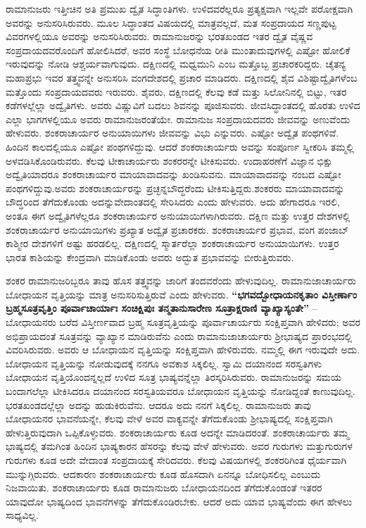 ರಾಮಾನುಜರು ಇತ್ತೀಚಿನ ಅತಿ ಪ್ರಮುಖ ದ್ವೈತ ಸಿದ್ಧಾಂತಿಗಳು. ಉಳಿದವರೆಲ್ಲರೂ ಪ್ರತ್ಯಕ್ಷವಾಗಿ ಇಲ್ಲವೇ ಪರೋಕ್ಷವಾಗಿ ಅವರನ್ನು ಅನುಸರಿಸಿರುವರು. ಮೂಲ ಸಿದ್ಧಾಂತದ ವಿಷಯದಲ್ಲಿ ಮಾತ್ರವಲ್ಲದೆ, ಮತ ಸಂಪ್ರದಾಯದ ಸಣ್ಣಪುಟ್ಟ ವಿವರಗಳಲ್ಲಿಯೂ ಅವರನ್ನು ಅನುಸರಿಸಿರುವರು. ರಾಮಾನುಜರನ್ನು ಭರತಖಂಡದ ಇತರ ದ್ವೈತ ವೈಷ್ಣವ ಸಂಪ್ರದಾಯದವರೊಂದಿಗೆ ಹೋಲಿಸಿದರೆ, ಅವರ ಸಂಸ್ಥೆ ಬೋಧನೆಯ ರೀತಿ ಮುಂತಾದುವುಗಳಲ್ಲಿ ಎಷ್ಟೋ ಹೋಲಿಕೆ ಇರುವುದನ್ನು ನೋಡಿ ಆಶ್ಚರ್ಯವಾಗುವುದು. ದಕ್ಷಿಣದಲ್ಲಿ ಮಧ್ವಮುನಿ ಎಂಬ ಮತ್ತೊಬ್ಬ ಪ್ರಚಾರಕರಿದ್ದರು. ಚೈತನ್ಯ ಮಹಾಪ್ರಭು ಇವರ ತತ್ತ್ವವನ್ನೇ ಅನುಸರಿಸಿ ವಂಗದೇಶದಲ್ಲಿ ಪ್ರಚಾರ ಮಾಡಿದರು. ದಕ್ಷಿಣದಲ್ಲಿ ಶೈವ ವಿಶಿಷ್ಟಾದ್ವೈತಿಗಳೆಂಬ ಮತ್ತೊಂದು ಸಂಪ್ರದಾಯದವರು ಇರುವರು. ಶೈವರು, ದಕ್ಷಿಣದಲ್ಲಿ ಕೆಲವು ಕಡೆ ಮತ್ತು ಸಿಲೋನಿನಲ್ಲಿ ಬಿಟ್ಟು, ಇತರ ಕಡೆಗಳಲ್ಲೆಲ್ಲಾ ಅದ್ವೈತಿಗಳು. ಅವರು ವಿಷ್ಣುವಿಗೆ ಬದಲು ಶಿವನನ್ನು ಪೂಜಿಸುವರು. ಜೀವಸಿದ್ಧಾಂತದಲ್ಲಿ ಹೊರತು ಉಳಿದ ಎಲ್ಲಾ ಭಾಗಗಳಲ್ಲಿಯೂ ಅವರು ರಾಮಾನುಜರಂತೆಯೇ. ರಾಮಾನುಜ ಸಂಪ್ರದಾಯದವರು ಜೀವವನ್ನು ಅಣುವೆಂದು ಹೇಳುವರು. ಶಂಕರಾಚಾರ್ಯರ ಅನುಯಾಯಿಗಳು ಜೀವವನ್ನು ವಿಭು ಎನ್ನುವರು. ಎಷ್ಟೋ ಅದ್ವೈತ ಪಂಥಗಳಿವೆ. ಹಿಂದಿನ ಕಾಲದಲ್ಲಿಯೂ ಎಷ್ಟೋ ಪಂಥಗಳಿದ್ದುವು. ಆದರೆ ಶಂಕರಾಚಾರ್ಯರು ಅವನ್ನು ಸಂಪೂರ್ಣ ಸ್ವೀಕರಿಸಿ ತಮ್ಮಲ್ಲಿ ಅಳವಡಿಸಿಕೊಂಡಿರುವರು. ಕೆಲವು ಟೀಕಾಚಾರ್ಯರು ಶಂಕರರನ್ನೇ ಟೀಕಿಸುವರು. ಉದಾಹರಣೆಗೆ ವಿಜ್ಞಾನ ಭಿಕ್ಷು ಅದ್ವೈತಿಯಾದರೂ ಶಂಕರಾಚಾರ್ಯರ ಮಾಯಾವಾದವನ್ನು ಖಂಡಿಸುವನು. ಮಾಯಾವಾದವನ್ನು ನಂಬದ ಎಷ್ಟೋ ಪಂಥಗಳಿದ್ದುವು.\break ಅವರು ಶಂಕರಾಚಾರ್ಯರನ್ನು ಪ್ರಚ್ಛನ್ನಬೌದ್ಧರೆಂದು ಟೀಕಿಸುತ್ತಿದ್ದರು.\break ಶಂಕರರು ಮಾಯಾವಾದವನ್ನು ಬೌದ್ಧರಿಂದ ತೆಗೆದುಕೊಂಡು ಅದನ್ನು\break ವೇದಾಂತದಲ್ಲಿ ಸೇರಿಸಿದರು ಎಂದು ಹೇಳುವರು. ಅದು ಹೇಗಾದರೂ ಇರಲಿ, ಅಂತೂ ಈಗ ಅದ್ವೈತಿಗಳೆಲ್ಲರೂ ಶಂಕರಾಚಾರ್ಯರ ಅನುಯಾಯಿಗಳಾಗಿರುವರು. ದಕ್ಷಿಣ ಮತ್ತು ಉತ್ತರ ದೇಶಗಳಲ್ಲಿ ಶಂಕರಾಚಾರ್ಯರ ಅನುಯಾಯಿಗಳು ಪ್ರಖ್ಯಾತ ಅದ್ವೈತ ಪ್ರಚಾರಕರು. ಶಂಕರಾಚಾರ್ಯರ ಪ್ರಭಾವ, ವಂಗ ಪಂಜಾಬ್​ ಕಾಶ್ಮೀರ ದೇಶಗಳಿಗೆ ಅಷ್ಟು ಹರಡಲಿಲ್ಲ. ದಕ್ಷಿಣದಲ್ಲಿ ಸ್ಮಾರ್ತರೆಲ್ಲಾ ಶಂಕರಾಚಾರ್ಯರ ಅನುಯಾಯಿಗಳು. ಉತ್ತರ ಭಾರತ ಕಾಶಿಯನ್ನು ಕೇಂದ್ರವಾಗಿ ಮಾಡಿಕೊಂಡು ಅವರು ಅದ್ಭುತ ಪ್ರಭಾವವನ್ನು ಬೀರುತ್ತಿರುವರು.

ಶಂಕರ ರಾಮಾನುಜರಿಬ್ಬರೂ ತಾವು ಹೊಸ ತತ್ತ್ವವನ್ನು ಜಾರಿಗೆ ತಂದವರೆಂದು ಹೇಳುವುದಿಲ್ಲ. ರಾಮಾನುಜಾಚಾರ್ಯರು ಬೋಧಾಯನ ವೃತ್ತಿಯನ್ನು ಮಾತ್ರ ಅನುಸರಿಸುತ್ತಿರುವೆ ಎಂದು ಹೇಳುವರು. \textbf{“ಭಗವದ್ಬೋಧಾಯನಕೃತಾಂ ವಿಸ್ತೀರ್ಣಾಂ ಬ್ರಹ್ಮಸೂತ್ರವೃತ್ತಿಂ ಪೂರ್ವಾಚಾರ್ಯಾಃ ಸಂಚಿಕ್ಷಿಪುಃ ತನ್ಮತಾನುಸಾರೇಣ ಸೂತ್ರಾಕ್ಷರಾಣಿ ವ್ಯಾಖ್ಯಾಸ್ಯಂತೇ”} – ಬೋಧಾಯನರು ಬರೆದ ವಿಸ್ತೀರ್ಣವಾದ ಬ್ರಹ್ಮ ಸೂತ್ರವೃತ್ತಿಯನ್ನು ಪೂರ್ವಾಚಾರ್ಯರು ಸಂಕ್ಷಿಪ್ತವಾಗಿ ಹೇಳಿದರು; ಅವರ ಅಭಿಪ್ರಾಯದಂತೆ ಸೂತ್ರವನ್ನು ವ್ಯಾಖ್ಯಾನ ಮಾಡಿರುವೆನು ಎಂದು ರಾಮಾನುಜಾಚಾರ್ಯರು ಶ‍್ರೀಭಾಷ್ಯದ ಪ್ರಾರಂಭದಲ್ಲಿ ವಿವರಿ\-ಸಿರುವರು. ಅವರು ಆ ಬೋಧಾಯನ ವೃತ್ತಿಯನ್ನು ಸಂಕ್ಷಿಪ್ತವಾಗಿ ಹೇಳಿರುವರು. ನಮ್ಮಲ್ಲಿ ಈಗ ಇರುವುದೇ ಅದು. ಬೋಧಾಯನ ವೃತ್ತಿಯನ್ನು ನೋಡುವುದಕ್ಕೆ ನನಗೂ ಅವಕಾಶ ಸಿಕ್ಕಲಿಲ್ಲ. ಸ್ವಾಮಿ ದಯಾನಂದ ಸರಸ್ವತಿಗಳು ಬೋಧಾಯನ ವೃತ್ತಿಯೊಂದನ್ನಲ್ಲದೆ ಉಳಿದ ಸೂತ್ರ ಭಾಷ್ಯವನ್ನೆಲ್ಲಾ ತಿರಸ್ಕರಿಸಿರುವರು. ರಾಮಾನುಜರನ್ನು ಸಮಯ ಬಂದಾಗಲೆಲ್ಲಾ ಟೀಕಿಸಿದರೂ ದಯಾನಂದ ಸರಸ್ವತಿಯವರೂ ಬೋಧಾಯನ ವೃತ್ತಿಯನ್ನು ನೋಡಿದ್ದಂತೆ ಕಾಣುವುದಿಲ್ಲ. ಭರತಖಂಡದಲ್ಲೆಲ್ಲಾ ಅದನ್ನು ಹುಡುಕಿರುವೆನು. ಆದರೂ ಅದು ನನಗೆ ಸಿಕ್ಕಲಿಲ್ಲ. ರಾಮಾನುಜರು ತಾವು ಬೋಧಾಯನರ ಭಾವನೆಯನ್ನೇ, ಕೆಲವು ವೇಳೆ ಅವರ ವಾಕ್ಯವನ್ನೇ ತೆಗೆದುಕೊಂಡು ಶ‍್ರೀಭಾಷ್ಯದಲ್ಲಿ ಸಂಕ್ಷಿಪ್ತವಾಗಿ ಹೇಳುತ್ತಿರುವುದಾಗಿ ಒಪ್ಪಿಕೊಳ್ಳುವರು. ಶಂಕರಾಚಾರ್ಯರು ಕೂಡ ಅದನ್ನೇ ಮಾಡಿದ\-ರಂತೆ. ಶಂಕರಾಚಾರ್ಯರು ತಮ್ಮ ಭಾಷ್ಯದಲ್ಲಿ ತಮಗಿಂತ ಹಿಂದಿನ ಭಾಷ್ಯಕಾರನ ಹೆಸರನ್ನು ಕೆಲವು ವೇಳೆ ಹೇಳುವರು. ಅವರ ಗುರುಗಳು ಮತ್ತು\break ಗುರುಗಳ ಗುರುಗಳು ಕೂಡ ಅದೇ ವೇದಾಂತ ಸಂಪ್ರದಾಯಕ್ಕೆ ಸೇರಿದವರು. ಕೆಲವು ವಿಷಯಗಳಲ್ಲಿ ಶಂಕರರಿಗಿಂತ ಧೈರ್ಯವಾಗಿ ಮುನ್ನುಗ್ಗಿರುವರು. ಆದಕಾರಣ ಶಂಕರಾಚಾರ್ಯರು ಕೂಡ ಹೊಸದಾಗಿ ಏನನ್ನೂ ಬೋಧಿಸಲಿಲ್ಲ ಎಂಬುದು ನಿಜವಾಯಿತು. ಶಂಕರಾಚಾರ್ಯರು ಕೂಡ ರಾಮಾನುಜರು ಬೋಧಾಯನದಿಂದ ತೆಗೆದುಕೊಂಡಂತೆ ಇತರರ ಯಾವುದೋ ಭಾಷ್ಯದಿಂದ ಭಾವನೆಗಳನ್ನು ತೆಗೆದುಕೊಂಡಿರಬೇಕು. ಆದರೆ ಅದು ಯಾವ ಭಾಷ್ಯವೆಂದು ಈಗ ಹೇಳಲು ಸಾಧ್ಯವಿಲ್ಲ.

